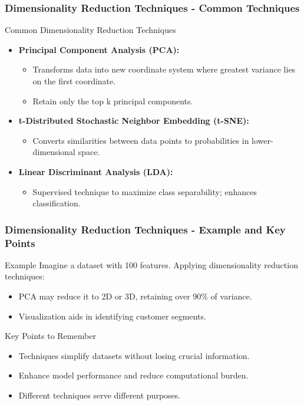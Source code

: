 \documentclass[aspectratio=169]{beamer}
\begin{document}
\begin{frame}[fragile]
    \frametitle{Dimensionality Reduction Techniques - Common Techniques}
    \begin{block}{Common Dimensionality Reduction Techniques}
        \begin{itemize}
            \item \textbf{Principal Component Analysis (PCA):}
            \begin{itemize}
                \item Transforms data into new coordinate system where greatest variance lies on the first coordinate.
                \item Retain only the top k principal components.
            \end{itemize}
            \item \textbf{t-Distributed Stochastic Neighbor Embedding (t-SNE):}
            \begin{itemize}
                \item Converts similarities between data points to probabilities in lower-dimensional space.
            \end{itemize}
            \item \textbf{Linear Discriminant Analysis (LDA):}
            \begin{itemize}
                \item Supervised technique to maximize class separability; enhances classification.
            \end{itemize}
        \end{itemize}
    \end{block}
\end{frame}

\begin{frame}[fragile]
    \frametitle{Dimensionality Reduction Techniques - Example and Key Points}
    \begin{block}{Example}
        Imagine a dataset with 100 features. Applying dimensionality reduction techniques:
        \begin{itemize}
            \item PCA may reduce it to 2D or 3D, retaining over 90\% of variance.
            \item Visualization aids in identifying customer segments.
        \end{itemize}
    \end{block}

    \begin{block}{Key Points to Remember}
        \begin{itemize}
            \item Techniques simplify datasets without losing crucial information.
            \item Enhance model performance and reduce computational burden.
            \item Different techniques serve different purposes.
        \end{itemize}
    \end{block}
\end{frame}
\end{document}
